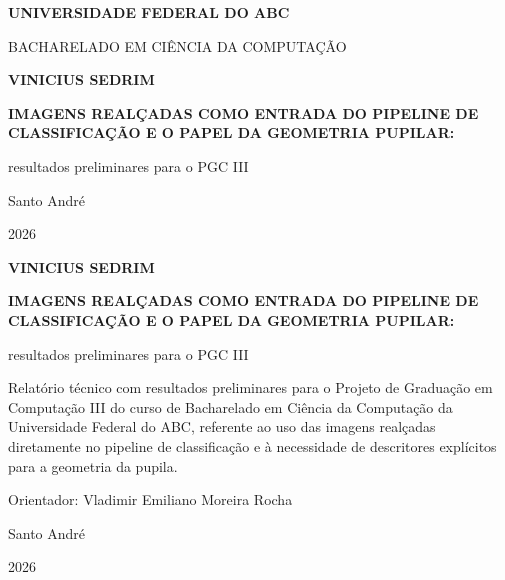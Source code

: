 \documentclass[12pt, oneside, a4paper, chapter=TITLE, section=TITLE,
               english, brazil]{abntex2}
\theoremstyle{plain}
\theoremstyle{definition}
\begin{document}
\frenchspacing

\begin{capa}
  \centering
  {\bfseries UNIVERSIDADE FEDERAL DO ABC\par}
  {BACHARELADO EM CIÊNCIA DA COMPUTAÇÃO\par}
  \vspace*{2.5cm}
  {\bfseries VINICIUS SEDRIM\par}
  \vfill
  {\bfseries IMAGENS REALÇADAS COMO ENTRADA DO PIPELINE DE CLASSIFICAÇÃO E O
  PAPEL DA GEOMETRIA PUPILAR:\par}
  \vspace{4pt}
  {resultados preliminares para o PGC III\par}
  \vfill
  Santo André\par
  2026\par
\end{capa}

\begin{folhaderosto}
  \centering
  {\bfseries VINICIUS SEDRIM\par}
  \vfill
  {\bfseries IMAGENS REALÇADAS COMO ENTRADA DO PIPELINE DE CLASSIFICAÇÃO E O
  PAPEL DA GEOMETRIA PUPILAR:\par}
  \vspace{4pt}
  {resultados preliminares para o PGC III\par}
  \vfill
  \hspace{.45\textwidth}%
  \begin{minipage}{.55\textwidth}
    \SingleSpacing
    Relatório técnico com resultados preliminares para o Projeto de
    Graduação em Computação III do curso de Bacharelado em Ciência da
    Computação da Universidade Federal do ABC, referente ao uso das imagens
    realçadas diretamente no pipeline de classificação e à necessidade de
    descritores explícitos para a geometria da pupila.

    \vspace{0.6cm}
    Orientador: Vladimir Emiliano Moreira Rocha
  \end{minipage}
  \vfill
  Santo André\par
  2026\par
\end{folhaderosto}
\end{document}

